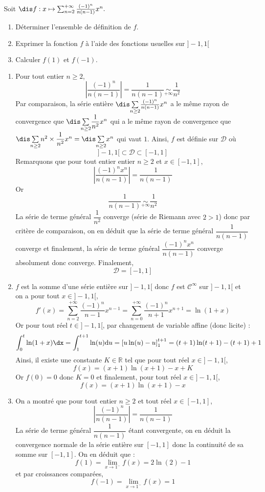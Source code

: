 \documentclass[a4paper,10pt]{report}
\newcommand{\Sum}[2]{\ensuremath{\textstyle{\sum\limits_{#1}^{#2}}}}
\begin{document}
\begin{Exa} Soit $\dis f : x \mapsto \sum_{n = 2}^{ + \infty} \frac{( - 1)^{n}}{n(n - 1)}x^{n}.$

  \begin{enumerate}
  \item
    Déterminer l'ensemble de définition de $f$.
  \item
    Exprimer la fonction $f$ à l'aide des fonctions usuelles sur $] - 1,1[$
  \item Calculer $f(1)$ et $f( - 1)$.
  \end{enumerate}
  \end{Exa} 
  
  \corr 
  
  
  \begin{enumerate}
  \item Pour tout entier $n \geq 2$,
  $$ \left\vert \frac{( - 1)^{n}}{n(n - 1)} \right\vert = \dfrac{1}{n(n-1)} \underset{+ \infty}{\sim} \dfrac{1}{n^2}$$
Par comparaison, la série entière $\dis \Sum{n \geq 2}{} \frac{( - 1)^{n}}{n(n - 1)}x^{n}$ a le même rayon de convergence que $\dis \Sum{n \geq 2}{} \dfrac{1}{n^2}x^{n}$ qui a le même rayon de convergence que $\dis \Sum{n \geq 2}{} n^2 \times \dfrac{1}{n^2} x^{n} = \dis \Sum{n \geq 2}{} x^n$ qui vaut $1$. Ainsi, $f$ est définie sur $\mathcal{D}$ où
$$ ]-1,1[ \subset \mathcal{D} \subset [-1,1]$$
Remarquons que pour tout entier entier $n \geq 2$ et $x \in [-1,1]$,
$$ \left\vert \dfrac{(-1)^n x^n }{n(n-1)} \right\vert = \dfrac{1}{n(n-1)} $$
Or 
$$ \dfrac{1}{n(n-1)} \underset{+ \infty}{\sim} \dfrac{1}{n^2}$$
La série de terme général $\dfrac{1}{n^2}$ converge (série de Riemann avec $2>1$) donc par critère de comparaison, on en déduit que la série de terme général $\dfrac{1}{n(n-1)}$ converge et finalement, la série de terme général $ \dfrac{(-1)^n x^n }{n(n-1)}$ converge absolument donc converge. Finalement,
$$ \mathcal{D} = [-1,1]$$
\item $f$ est la somme d'une série entière sur $]-1,1[$ donc $f$ est $\mathcal{C}^{\infty}$ sur $]-1,1[$ et on a pour tout $x \in ]-1,1[$,
$$ f'(x) = \sum_{n=2}^{+ \infty} \dfrac{(-1)^n}{n-1} x^{n-1} =  \sum_{n=0}^{+ \infty} \dfrac{(-1)^{n}}{n+1} x^{n+1} = \ln(1+x)$$
Or pour tout réel $t \in ]-1,1[$, par changement de variable affine (donc licite) :
$$ \int_0^t \ln(1+x) \dx = \int_1^{t+1} \ln(u) \textrm{d}u = \left[ u \ln(u)-u \right]_1^{t+1} = (t+1)\ln(t+1)-(t+1) +1$$
Ainsi, il existe une constante $K \in \mathbb{R}$ tel que pour tout réel $x \in ]-1,1[$,
$$ f(x) = (x+1) \ln(x+1) - x + K$$
Or $f(0)=0$ donc $K=0$ et finalement, 
pour tout réel $x \in ]-1,1[$,
$$ f(x) = (x+1) \ln(x+1) - x $$
  \item On a montré que pour tout entier $n \geq 2$ et tout réel $x \in [-1,1]$,
  $$ \left\vert \frac{( - 1)^{n}}{n(n - 1)} \right\vert = \dfrac{1}{n(n-1)}$$
La série de terme général $\dfrac{1}{n(n-1)}$ étant convergente, on en déduit la convergence normale de la série entière sur $[-1,1]$ donc la continuité de sa somme sur $[-1,1]$. On en déduit que :
$$ f(1) = \lim_{x \rightarrow 1^{-}} f(x) =  2 \ln(2)-1$$
et par croissances comparées,
$$ f(-1) = \lim_{x \rightarrow 1^{-}} f(x) =  1$$
  \end{enumerate}
  
\end{document}
